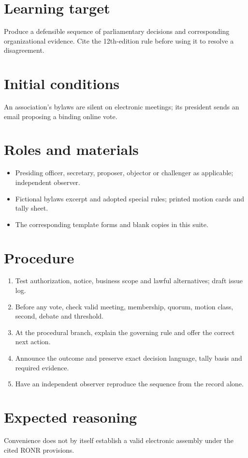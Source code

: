 \documentclass[11pt]{article}
\begin{document}
\SuiteOpen
\section{Learning target}
Produce a defensible sequence of parliamentary decisions and corresponding organizational evidence. Cite the 12th-edition rule before using it to resolve a disagreement.

\section{Initial conditions}
An association’s bylaws are silent on electronic meetings; its president sends an email proposing a binding online vote.

\section{Roles and materials}
\begin{itemize}[leftmargin=*,itemsep=4pt]
\item Presiding officer, secretary, proposer, objector or challenger as applicable; independent observer.
\item Fictional bylaws excerpt and adopted special rules; printed motion cards and tally sheet.
\item The corresponding template forms and blank copies in this suite.
\end{itemize}

\section{Procedure}
\begin{enumerate}[leftmargin=*,itemsep=4pt]
\item Test authorization, notice, business scope and lawful alternatives; draft issue log.
\item Before any vote, check valid meeting, membership, quorum, motion class, second, debate and threshold.
\item At the procedural branch, explain the governing rule and offer the correct next action.
\item Announce the outcome and preserve exact decision language, tally basis and required evidence.
\item Have an independent observer reproduce the sequence from the record alone.
\end{enumerate}

\section{Expected reasoning}
Convenience does not by itself establish a valid electronic assembly under the cited RONR provisions.
\end{document}
